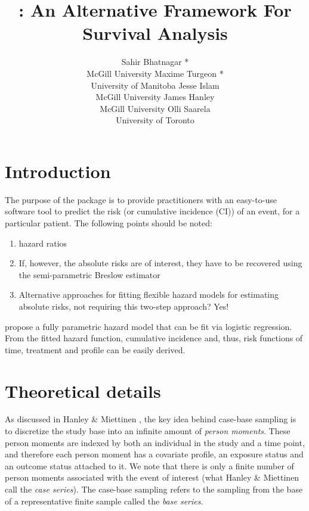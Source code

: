 \documentclass[
]{jss}
\author{
Sahir Bhatnagar *\\McGill University \And Maxime Turgeon *\\University of Manitoba \AND Jesse Islam\\McGill University \And James Hanley\\McGill University \And Olli Saarela\\University of Toronto
}
\title{\pkg{casebase}: An Alternative Framework For Survival Analysis}
\providecommand{\tightlist}{%
  \setlength{\itemsep}{0pt}\setlength{\parskip}{0pt}}
\begin{document}
\hypertarget{introduction}{%
\section{Introduction}\label{introduction}}

The purpose of the  package is to provide practitioners
with an easy-to-use software tool to predict the risk (or cumulative
incidence (CI)) of an event, for a particular patient. The following
points should be noted:

\begin{enumerate}
\def\labelenumi{\arabic{enumi}.}
\tightlist
\item
  hazard ratios
\item
  If, however, the absolute risks are of interest, they have to be
  recovered using the semi-parametric Breslow estimator
\item
  Alternative approaches for fitting flexible hazard models for
  estimating absolute risks, not requiring this two-step approach? Yes!
  \citep{hanley2009fitting}
\end{enumerate}

\citep{hanley2009fitting} propose a fully parametric hazard model that
can be fit via logistic regression. From the fitted hazard function,
cumulative incidence and, thus, risk functions of time, treatment and
profile can be easily derived.

\hypertarget{theoretical-details}{%
\section{Theoretical details}\label{theoretical-details}}

As discussed in Hanley \& Miettinen \citeyearpar{hanley2009fitting}, the
key idea behind case-base sampling is to discretize the study base into
an infinite amount of \emph{person moments}. These person moments are
indexed by both an individual in the study and a time point, and
therefore each person moment has a covariate profile, an exposure status
and an outcome status attached to it. We note that there is only a
finite number of person moments associated with the event of interest
(what Hanley \& Miettinen call the \emph{case series}). The case-base
sampling refers to the sampling from the base of a representative finite
sample called the \emph{base series}.
\end{document}
